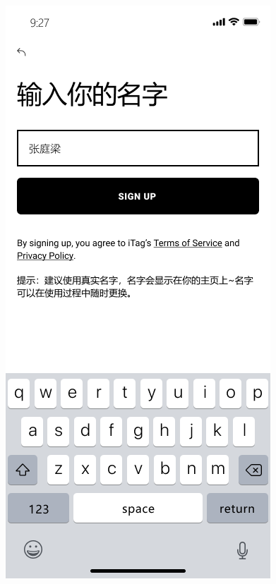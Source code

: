 \documentclass[UTF8]{ctexart}
\begin{document}
\begin{figure}[htbp]
{\begin{minipage}[b]{.3\linewidth}
            \includegraphics[scale=0.3]{Registerstep2.png}
        \end{minipage}
    }
\end{figure}
\end{document}
